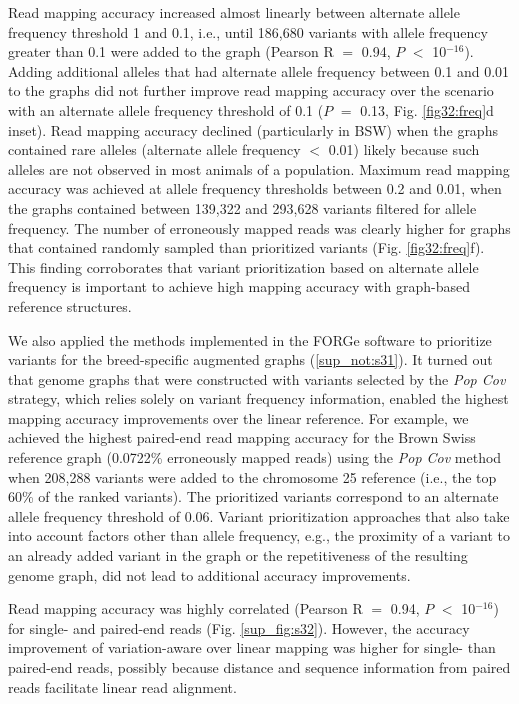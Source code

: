 \documentclass[../main.tex]{subfiles}
\begin{document}
Read mapping accuracy increased almost linearly between alternate allele frequency threshold 1 and 0.1, i.e., until 186,680 variants with allele frequency greater than 0.1 were added to the graph (Pearson R $=$ 0.94, $P$ $<$ 10$^{-16}$). Adding additional alleles that had alternate allele frequency between 0.1 and 0.01 to the graphs did not further improve read mapping accuracy over the scenario with an alternate allele frequency threshold of 0.1 ($P$ $=$ 0.13, Fig. \ref{fig32:freq}d inset). Read mapping accuracy declined (particularly in BSW) when the graphs contained rare alleles (alternate allele frequency $<$ 0.01) likely because such alleles are not observed in most animals of a population. Maximum read mapping accuracy was achieved at allele frequency thresholds between 0.2 and 0.01, when the graphs contained between 139,322 and 293,628 variants filtered for allele frequency. The number of erroneously mapped reads was clearly higher for graphs that contained randomly sampled than prioritized variants (Fig. \ref{fig32:freq}f). This finding corroborates that variant prioritization based on alternate allele frequency is important to achieve high mapping accuracy with graph-based reference structures.

We also applied the methods implemented in the FORGe software \citep{pritt2018forge} to prioritize variants for the breed-specific augmented graphs (\ref{sup_not:s31}). It turned out that genome graphs that were constructed with variants selected by the \emph{Pop Cov} strategy, which relies solely on variant frequency information, enabled the highest mapping accuracy improvements over the linear reference. For example, we achieved the highest paired-end read mapping accuracy for the Brown Swiss reference graph (0.0722\% erroneously mapped reads) using the \emph{Pop Cov} method when 208,288 variants were added to the chromosome 25 reference (i.e., the top 60\% of the ranked variants). The prioritized variants correspond to an alternate allele frequency threshold of 0.06. Variant prioritization approaches that also take into account factors other than allele frequency, e.g., the proximity of a variant to an already added variant in the graph or the repetitiveness of the resulting genome graph, did not lead to additional accuracy improvements.

Read mapping accuracy was highly correlated (Pearson R $=$ 0.94, $P$ $<$ 10$^{-16}$) for single- and paired-end reads (Fig. \ref{sup_fig:s32}). However, the accuracy improvement of variation-aware over linear mapping was higher for single- than paired-end reads, possibly because distance and sequence information from paired reads facilitate linear read alignment.
\end{document}
